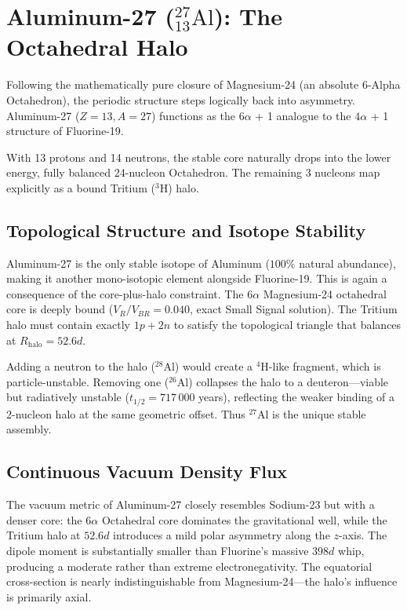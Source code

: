 \chapter{Aluminum-27 ($^{27}_{13}\text{Al}$): The Octahedral Halo}
\label{ch:aluminum}

Following the mathematically pure closure of Magnesium-24 (an absolute 6-Alpha Octahedron), the periodic structure steps logically back into asymmetry. Aluminum-27 ($Z=13, A=27$) functions as the $6\alpha$ + 1 analogue to the $4\alpha$ + 1 structure of Fluorine-19. 

With 13 protons and 14 neutrons, the stable core naturally drops into the lower energy, fully balanced 24-nucleon Octahedron. The remaining 3 nucleons map explicitly as a bound Tritium ($^3\text{H}$) halo.

\section{Topological Structure and Isotope Stability}
Aluminum-27 is the only stable isotope of Aluminum ($100\%$ natural abundance), making it another mono-isotopic element alongside Fluorine-19. This is again a consequence of the core-plus-halo constraint. The $6\alpha$ Magnesium-24 octahedral core is deeply bound ($V_R/V_{BR} = 0.040$, exact Small Signal solution). The Tritium halo must contain exactly $1p + 2n$ to satisfy the topological triangle that balances at $R_{\text{halo}} = 52.6d$.

Adding a neutron to the halo ($^{28}$Al) would create a $^4\text{H}$-like fragment, which is particle-unstable. Removing one ($^{26}$Al) collapses the halo to a deuteron---viable but radiatively unstable ($t_{1/2} = 717\,000$ years), reflecting the weaker binding of a 2-nucleon halo at the same geometric offset. Thus $^{27}$Al is the unique stable assembly.

\section{Continuous Vacuum Density Flux}
The vacuum metric of Aluminum-27 closely resembles Sodium-23 but with a denser core: the $6\alpha$ Octahedral core dominates the gravitational well, while the Tritium halo at $52.6d$ introduces a mild polar asymmetry along the $z$-axis. The dipole moment is substantially smaller than Fluorine's massive $398d$ whip, producing a moderate rather than extreme electronegativity. The equatorial cross-section is nearly indistinguishable from Magnesium-24---the halo's influence is primarily axial.

